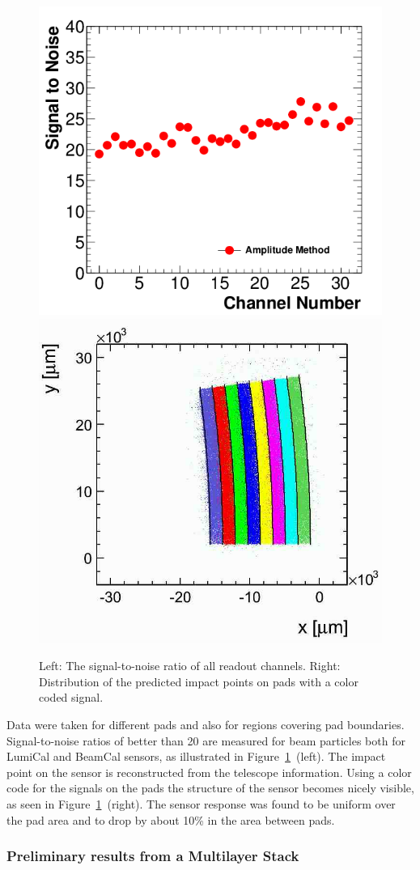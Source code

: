 \begin{figure}[htpb]
\centering
  \includegraphics[width=0.45\columnwidth]{Calorimeter/FCAL/figs/StoN_AmplitudeMethod_TB11} \hfill
  \includegraphics[width=0.45\columnwidth]{Calorimeter/FCAL/figs/hit_map_area1}
  \caption{Left: The signal-to-noise ratio of all readout channels.
          Right: Distribution of the predicted impact points on pads with a color coded signal.}
\label{fig:sinalnoise}
\end{figure}
Data were taken for different pads and also for regions covering pad boundaries.
Signal-to-noise ratios
of better than 20 are measured for beam particles both for LumiCal and BeamCal sensors,
as illustrated in Figure~\ref{fig:sinalnoise}~(left).
The impact point on the sensor is reconstructed from the telescope information.
Using a color code for the signals on the pads
the structure of the sensor becomes nicely visible, as seen in Figure~\ref{fig:sinalnoise}~(right).
The sensor response was found to be uniform over the pad area and to drop by about 10\% in the
area between pads.

\subsubsection{Preliminary results from a Multilayer Stack}

